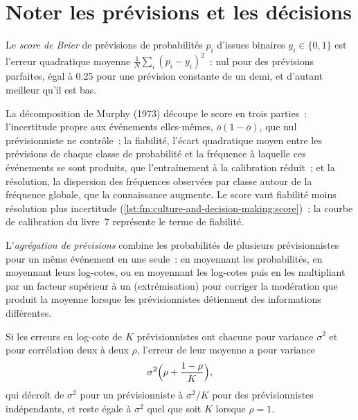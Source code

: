 \section{Noter les prévisions et les décisions}

\begin{definition}\label{def:fm:culture-and-decision-making:brier}
Le \emph{score de Brier} de prévisions de probabilités $p_i$ d'issues binaires $y_i\in\{0,1\}$ est l'erreur quadratique moyenne
$\frac1N\sum_i(p_i-y_i)^2$~: nul pour des prévisions parfaites, égal à 0.25 pour une prévision constante de un demi, et d'autant meilleur qu'il est bas.
\end{definition}

La décomposition de Murphy (1973) découpe le score en trois parties~: l'incertitude propre aux événements elles-mêmes, $\bar o(1-\bar o)$, que nul prévisionniste ne
contrôle~; la fiabilité, l'écart quadratique moyen entre les prévisions de chaque classe de probabilité et la fréquence à laquelle ces événements se sont produits,
que l'entraînement à la calibration réduit~; et la résolution, la dispersion des fréquences observées par classe autour de la fréquence globale, que la connaissance
augmente. Le score vaut fiabilité moins résolution plus incertitude (\cref{lst:fm:culture-and-decision-making:score})~; la courbe de calibration du livre~7
représente le terme de fiabilité.

\label{lst:fm:culture-and-decision-making:score}

\begin{definition}\label{def:fm:culture-and-decision-making:agg}
L'\emph{agrégation de prévisions} combine les probabilités de plusieurs prévisionnistes pour un même événement en une seule~: en moyennant les
probabilités, en moyennant leurs log-cotes, ou en moyennant les log-cotes puis en les multipliant par un facteur supérieur à un (extrémisation) pour corriger la modération
que produit la moyenne lorsque les prévisionnistes détiennent des informations différentes.
\end{definition}

\begin{proposition}\label{prop:fm:culture-and-decision-making:rho}
Si les erreurs en log-cote de $K$ prévisionnistes ont chacune pour variance $\sigma^2$ et pour corrélation deux à deux $\rho$, l'erreur de leur moyenne a pour variance
\[
\sigma^2\Bigl(\rho+\frac{1-\rho}{K}\Bigr),
\]
qui décroît de $\sigma^2$ pour un prévisionniste à $\sigma^2/K$ pour des prévisionnistes indépendants, et reste égale à $\sigma^2$ quel que soit $K$ lorsque $\rho=1$.
\end{proposition}

